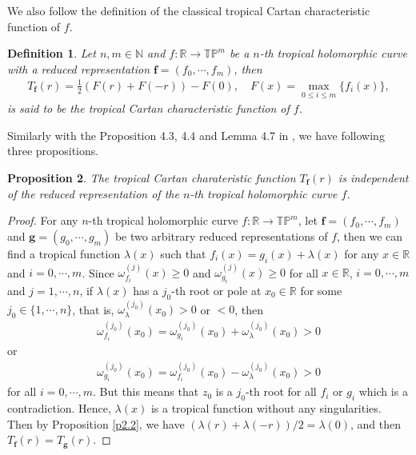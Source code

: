\documentclass{article}
\newtheorem{defin}{Definition}[section]
\newenvironment{definition}{\begin{defin}\rm}{\end{defin}}
\newtheorem{proposition}[defin]{Proposition}
\begin{document}
 We also follow the definition of the classical tropical Cartan characteristic function of $f$.
    \begin{definition}
        \cite[Definition 4.2]{Pro} Let $n, m\in\mathbb{N}$ and $f:\mathbb{R}\rightarrow \mathbb{T}\mathbb{P}^{m}$ be a $n$-th tropical holomorphic curve with a reduced representation $\textbf{f}=(f_{0}, \cdots, f_{m})$, then
        \begin{eqnarray*}
            T_{\textbf{f}}(r)=\frac{1}{2}(F(r)+F(-r))-F(0),\quad F(x)=\max\limits_{0\leq i\leq m}\{f_{i}(x)\},
        \end{eqnarray*}
        is said to be the tropical Cartan characteristic function of $f$.
    \end{definition}

Similarly with the Proposition 4.3, 4.4 and Lemma 4.7 in \cite{Pro}, we have following three propositions.
\begin{proposition}\label{p5.2}
    The tropical Cartan charateristic function $T_{\textbf{f}}(r)$ is independent of the reduced representation of the $n$-th tropical holomorphic curve $f$.
\end{proposition}
\begin{proof}
    For any $n$-th tropical holomorphic curve $f:\mathbb{R}\rightarrow\mathbb{T}\mathbb{P}^{m}$, let $\textbf{f}=(f_{0}, \cdots, f_{m})$ and $\textbf{g}=(g_{0}, \cdots, g_{m})$ be two arbitrary reduced representations of $f$, then we can find a tropical function $\lambda(x)$ such that $f_{i}(x)=g_{i}(x)+\lambda(x)$ for any $x\in\mathbb{R}$ and $i=0, \cdots, m$. Since $\omega_{f_{i}}^{(j)}(x)\geq 0$ and $\omega_{g_{i}}^{(j)}(x)\geq 0$ for all $x\in\mathbb{R}$, $i=0,\cdots,m$ and $j=1, \cdots, n$, if $\lambda(x)$ has a $j_{0}$-th root or pole at $x_{0}\in\mathbb{R}$ for some $j_{0}\in\{1, \cdots, n\}$, that is,  $\omega_{\lambda}^{(j_{0})}(x_{0})>0$ or $<0$, then
    \begin{eqnarray*}
        \omega_{f_{i}}^{(j_{0})}(x_{0})=\omega_{g_{i}}^{(j_{0})}(x_{0})+\omega_{\lambda}^{(j_{0})}(x_{0})>0
    \end{eqnarray*}
    or
    \begin{eqnarray*}
        \omega_{g_{i}}^{(j_{0})}(x_{0})=\omega_{f_{i}}^{(j_{0})}(x_{0})-\omega_{\lambda}^{(j_{0})}(x_{0})>0
    \end{eqnarray*}
    for all $i=0, \cdots, m$. But this means that $z_{0}$ is a $j_{0}$-th root for all $f_{i}$ or $g_{i}$ which is a contradiction. Hence, $\lambda(x)$ is a tropical function without any singularities. Then by Proposition \ref{p2.2}, we have $(\lambda(r)+\lambda(-r))/2=\lambda(0)$, and then $T_{\textbf{f}}(r)=T_{\textbf{g}}(r)$.
\end{proof}
\end{document}
